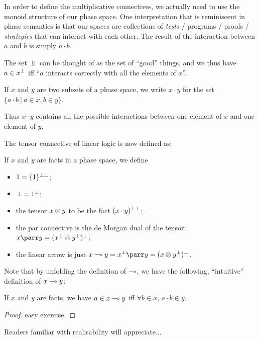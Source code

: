 In order to define the multiplicative connectives, we actually need to
use the monoid structure of our phase space. One interpretation that is
reminiscent in phase semantics is that our spaces are collections of
\emph{tests} / programs / proofs / \emph{strategies} that can interact
with each other. The result of the interaction between \(a\) and \(b\)
is simply \(a\cdot b\).

The set \(\Bot\) can be thought of as the set of ``good'' things, and we
thus have \(a\in x^\bot\) iff ``\(a\) interacts correctly with all the
elements of \(x\)''.

\begin{definition}
If $x$ and $y$ are two subsets of a phase space, we write $x\cdot y$ for the set $\{a\cdot b\ |\ a\in x, b\in y\}$.
\end{definition}

Thus \(x\cdot y\) contains all the possible interactions between one
element of \(x\) and one element of \(y\).

The tensor connective of linear logic is now defined as:

\begin{definition}
If $x$ and $y$ are facts in a phase space, we define
\begin{itemize}
  \item $1 = \{1\}^{\bot\bot}$;
  \item $\bot = 1^\bot$;
  \item the tensor $x\otimes y$ to be the fact $(x\cdot y)^{\bot\bot}$;
  \item the par connective is the de Morgan dual of the tensor: $x\parr y = (x\orth \tens y\orth)\orth$;
  \item the linear arrow is just $x\limp y = x\orth\parr y = (x\tens y\orth)\orth$.
  \end{itemize}
\end{definition}

Note that by unfolding the definition of \(\multimap\), we have the
following, ``intuitive'' definition of \(x\multimap y\):

\begin{lemma}
If $x$ and $y$ are facts, we have $a\in x\multimap y$ iff $\forall b\in x,\,a\cdot b\in y$.
\end{lemma}

\begin{proof}
easy exercise.
\end{proof}

Readers familiar with realisability will appreciate...

